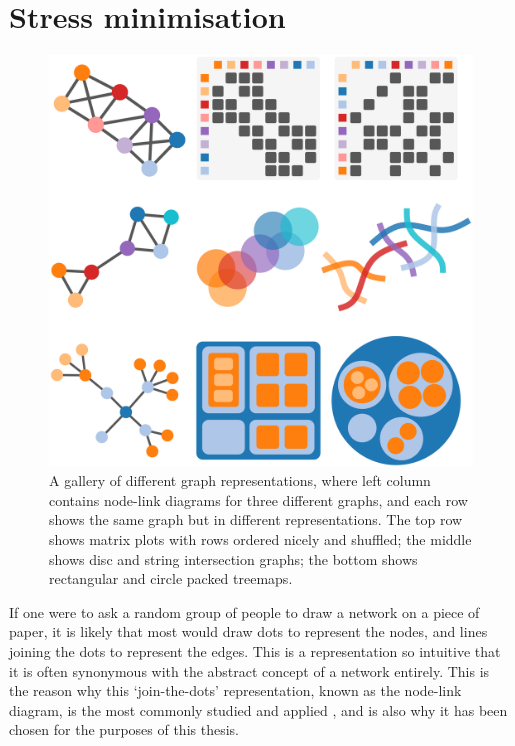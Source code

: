 \chapter{Stress minimisation}
\label{chap:stress}
\begin{figure}
  \centering
  \includegraphics[width=\textwidth]{stress/representations.pdf}
  \caption[A gallery of graph representations]{A gallery of different graph representations, where left column contains node-link diagrams for three different graphs, and each row shows the same graph but in different representations. The top row shows matrix plots with rows ordered nicely and shuffled; the middle shows disc and string intersection graphs; the bottom shows rectangular and circle packed treemaps.
  }
  \label{fig:graph_representations}
\end{figure}

If one were to ask a random group of people to draw a network on a piece of paper, it is likely that most would draw dots to represent the nodes, and lines joining the dots to represent the edges. This is a representation so intuitive that it is often synonymous with the abstract concept of a network entirely.
This is the reason why this `join-the-dots' representation, known as the node-link diagram, is the most commonly studied and applied \citep{Ghoniem2004}, and is also why it has been chosen for the purposes of this thesis.

